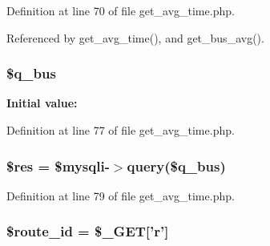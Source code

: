 Definition at line 70 of file get\_\-avg\_\-time.php.



Referenced by get\_\-avg\_\-time(), and get\_\-bus\_\-avg().

\hypertarget{get__avg__time_8php_a531a3cdb9017f75f6acb74a688f1ceeb_a531a3cdb9017f75f6acb74a688f1ceeb}{
\subsubsection[{\$q\_\-bus}]{\setlength{\rightskip}{0pt plus 5cm}\$q\_\-bus}}
\label{get__avg__time_8php_a531a3cdb9017f75f6acb74a688f1ceeb_a531a3cdb9017f75f6acb74a688f1ceeb}
{\bfseries Initial value:}


Definition at line 77 of file get\_\-avg\_\-time.php.

\hypertarget{get__avg__time_8php_a49a8a4009b02e49717caa88b128affc5_a49a8a4009b02e49717caa88b128affc5}{
\subsubsection[{\$res}]{\setlength{\rightskip}{0pt plus 5cm}\$res = \$mysqli-\/$>$query(\$q\_\-bus)}}
\label{get__avg__time_8php_a49a8a4009b02e49717caa88b128affc5_a49a8a4009b02e49717caa88b128affc5}


Definition at line 79 of file get\_\-avg\_\-time.php.

\hypertarget{get__avg__time_8php_a053b1e7578c0ad2a0dd68068b071f3ed_a053b1e7578c0ad2a0dd68068b071f3ed}{
\subsubsection[{\$route\_\-id}]{\setlength{\rightskip}{0pt plus 5cm}\$route\_\-id = \$\_\-GET\mbox{[}'r'\mbox{]}}}
\label{get__avg__time_8php_a053b1e7578c0ad2a0dd68068b071f3ed_a053b1e7578c0ad2a0dd68068b071f3ed}


